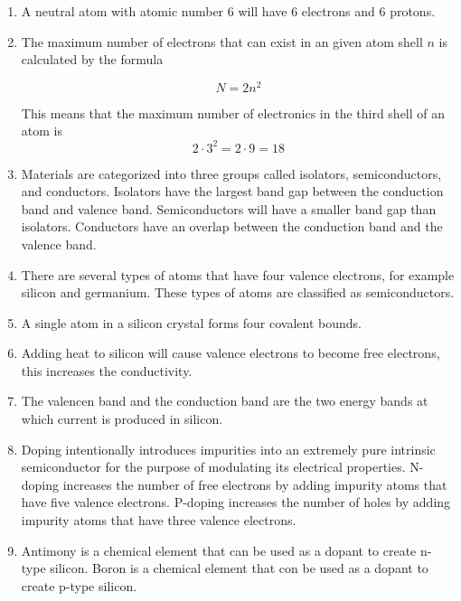 \documentclass[fleqn]{article}
\begin{document}
\begin{enumerate}[label=\textbf{\arabic*.}]

\item A neutral atom with atomic number 6 will have 6 electrons and 6 protons. 
  
\item The maximum number of electrons that can exist in an given atom shell $ n $ is calculated by the formula

\[
  N = 2n^2
\]

This means that the maximum number of electronics in the third shell of an atom is
\[ 
  2 \cdot 3^2 = 2 \cdot 9 = 18
\]

\item
Materials are categorized into three groups called isolators, semiconductors, and conductors. Isolators have the largest band gap between the conduction band and valence band. Semiconductors will have a smaller band gap than isolators. Conductors have an overlap between the conduction band and the valence band.

\item
There are several types of atoms that have four valence electrons, for example silicon and germanium. These types of atoms are classified as semiconductors.

\item
A single atom in a silicon crystal forms four covalent bounds.

\item
Adding heat to silicon will cause valence electrons to become free electrons, this increases the conductivity.

\item
The valencen band and the conduction band are the two energy bands at which current is produced in silicon.

\item
Doping intentionally introduces impurities into an extremely pure intrinsic semiconductor for the purpose of modulating its electrical properties. N-doping increases the number of free electrons by adding impurity atoms that have five valence electrons. P-doping increases the number of holes by adding impurity atoms that have three valence electrons.

\item
Antimony is a chemical element that can be used as a dopant to create n-type silicon. Boron is a chemical element that con be used as a dopant to create p-type silicon.

\end{enumerate}
\end{document}
